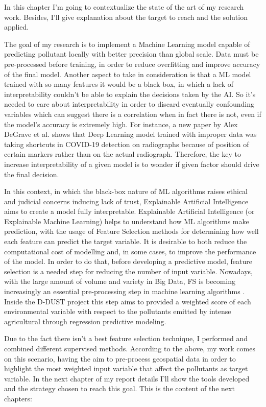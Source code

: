 In this chapter I'm going to contextualize the state of the art of my research work. 
Besides, I'll give explanation about the target to reach and the solution applied.\par
The goal of my research is to implement a Machine Learning model capable of predicting pollutant locally with better precision than global scale. 
Data must be pre-processed before training, in order to reduce overfitting and improve accuracy of the final model.\newline
Another aspect to take in consideration is that a ML model trained with so many features it would be a black box, in which a lack of interpretability couldn't be able to explain the decisions taken by the AI.
So it's needed to care about interpretability in order to discard eventually confounding variables  which can suggest there is a correlation when in fact there is not, even if the model's accuracy is extremely high. \newline
For instance, a new paper by Alex DeGrave et al.\cite{degrave2021ai} shows that Deep Learning model trained with improper data was taking shortcuts in COVID-19 detection on radiographs because of position of certain markers rather than on the actual radiograph.
Therefore, the key to increase interpretability of a given model is to wonder if given factor should drive the final decision.\par
In this context, in which the black-box nature of ML algorithms raises ethical and judicial concerns inducing lack of trust\cite{9141213}, Explainable Artificial Intelligence aims to create a model fully interpretable.
Explainable Artificial Intelligence (or Explainable Machine Learning) helps to understand how ML algorithms make prediction, with the usage of Feature Selection methods for determining how well each feature can predict the target variable.
It is desirable to both reduce the computational cost of modelling and, in some cases, to improve the performance of the model.\newline
In order to do that, before developing a predictive model, feature selection is a needed step for reducing the number of input variable. \newline
Nowadays, with the large amount of volume and variety in Big Data, FS is becoming increasingly an essential pre-processing step in machine learning algorithms \cite{kamolov2021feature}.
Inside the D-DUST project this step aims to provided a weighted score of each environmental variable with respect to the pollutants emitted by intense agricultural through regression predictive modeling.\newline
\par
\bigskip
Due to the fact there isn’t a best feature selection technique, I performed and combined different supervised methods. \newline
According to the above, my work comes on this scenario, having the aim to pre-process geospatial data in order to highlight the most weighted input variable that affect the pollutants as target variable.\newline
In the next chapter of my report details I'll show the tools developed and the strategy chosen to reach this goal. 
This is the content of the next chapters:

